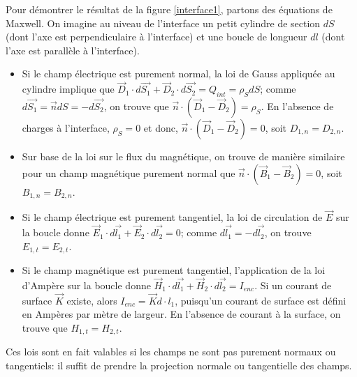  Pour démontrer le résultat de la figure \ref{interface1}, partons des équations de Maxwell. On imagine au niveau de l'interface un petit cylindre de section $dS$ (dont l'axe est perpendiculaire à l'interface) et une boucle de longueur $dl$ (dont l'axe est parallèle à l'interface). 
\begin{itemize}
\item Si le champ électrique est purement normal, la loi de Gauss appliquée au cylindre  implique que $\vec{D}_{1}\cdot d\vec{S_1} +  \vec{D}_{2}\cdot d\vec{S_2} = Q_{int} = \rho_S dS$; comme $d\vec{S_1} = \vec{n}dS = -d\vec{S_2}$, on trouve que $\vec{n}\cdot(\vec{D}_{1} - \vec{D}_{2}) = \rho_S$. En l'absence de charges à l'interface, $\rho_S = 0$ et donc, $\vec{n}\cdot(\vec{D}_{1} - \vec{D}_{2}) = 0$, soit ${D}_{1,n} = {D}_{2,n}$.
\item Sur base de la loi sur le flux du magnétique, on trouve de manière similaire pour un champ magnétique purement normal que $\vec{n}\cdot(\vec{B}_{1} - \vec{B}_{2}) = 0$, soit ${B}_{1,n} = {B}_{2,n}$.
\item Si le champ électrique est purement tangentiel, la loi de circulation de $\vec{E}$ sur la boucle donne $\vec{E}_1\cdot d\vec{l_1} + \vec{E}_2\cdot d\vec{l_2} = 0$; comme $d\vec{l_1} = - d\vec{l_2}$, on trouve  ${E}_{1,t} =  {E}_{2,t}$.
\item Si le champ magnétique est purement tangentiel, l'application de la loi d'Ampère sur la boucle donne $\vec{H}_1\cdot d\vec{l_1} + \vec{H}_2\cdot d\vec{l_2} = I_{enc}$. Si un courant de surface $\vec{K}$ existe, alors $I_{enc} = \vec{K} d\cdot{l_1}$, puisqu'un courant de surface est défini en Ampères par mètre de largeur. En l'absence de courant à la surface, on trouve que ${H}_{1,t} =  {H}_{2,t}$.
\end{itemize} 
 
Ces lois sont en fait valables si les champs ne sont pas purement normaux ou tangentiels: il suffit de prendre la projection normale ou tangentielle des champs.
 

